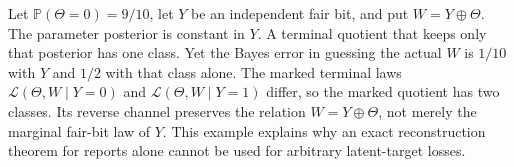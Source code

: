 \begin{example}
\label{ex:v10-xor}
Let $\mathbb P(\Theta=0)=9/10$, let $Y$ be an independent fair bit,
and put $W=Y\mathbin{\oplus}\Theta$. The parameter posterior is
constant in $Y$. A terminal quotient that keeps only that posterior
has one class. Yet the Bayes error in guessing the actual $W$ is
$1/10$ with $Y$ and $1/2$ with that class alone. The marked terminal
laws $\mathcal L(\Theta,W\mid Y=0)$ and
$\mathcal L(\Theta,W\mid Y=1)$ differ, so the marked quotient has two
classes. Its reverse channel preserves the relation
$W=Y\mathbin{\oplus}\Theta$, not merely the marginal fair-bit law of
$Y$. This example explains why an exact reconstruction theorem for
reports alone cannot be used for arbitrary latent-target losses.
\end{example}
